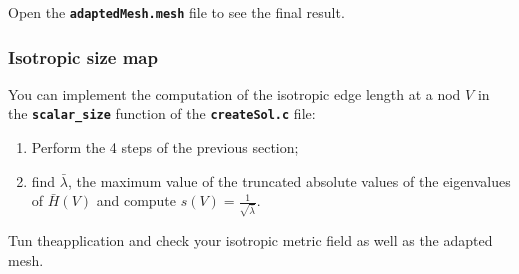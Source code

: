 \documentclass{article}
\newcommand{\ttb}[1]{\texttt{\textbf{#1}}}
\begin{document}
Open the \ttb{adaptedMesh.mesh} file to see the final result.

\subsubsection{Isotropic size map}
You can implement the computation of the isotropic edge length at a
nod $V$ in the \ttb{scalar\_size} function of the \ttb{createSol.c}
file:

\begin{enumerate}
\item Perform the 4 steps of the previous section;
\item find $\bar{\lambda}$, the maximum value of the truncated absolute values
  of the eigenvalues of $\bar{H}(V)$ and compute
  $ s(V) = \frac{1}{\sqrt{\bar{\lambda}}}$.
\end{enumerate}
Tun theapplication and check your isotropic metric
field as well as the adapted mesh.\\
\end{document}
